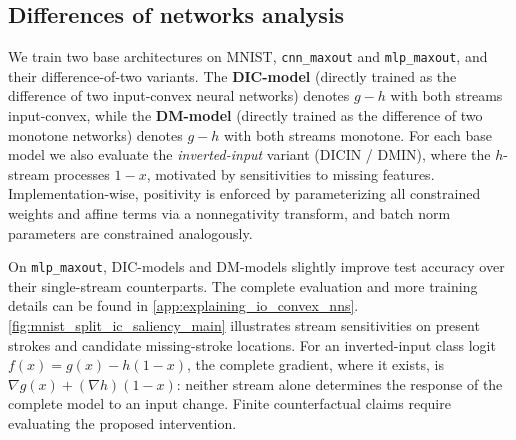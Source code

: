 \subsection{Differences of networks analysis} \label{subsec:dc_network_training_methods}



We train two base architectures on MNIST, \texttt{cnn\_maxout} and \texttt{mlp\_maxout}, and their difference-of-two variants.
The \textbf{DIC-model} (directly trained as the difference of two input-convex neural networks) denotes $g-h$ with both streams input-convex, while the \textbf{DM-model} (directly trained as the difference of two monotone networks) denotes $g-h$ with both streams monotone.
For each base model we also evaluate the \emph{inverted-input} variant (DIC\-IN / DM\-IN), where the $h$-stream processes $1-x$, motivated by sensitivities to missing features.
Implementation-wise, positivity is enforced by parameterizing all constrained weights and affine terms via a nonnegativity transform, and batch norm parameters are constrained analogously.

On \texttt{mlp\_maxout}, DIC-models and DM-models slightly improve test accuracy over their single-stream counterparts.
The complete evaluation and more training details can be found in \cref{app:explaining_io_convex_nns}.
\cref{fig:mnist_split_ic_saliency_main} illustrates stream sensitivities on present strokes and candidate missing-stroke locations. For an inverted-input class logit $f(x)=g(x)-h(1-x)$, the complete gradient, where it exists, is $\nabla g(x)+(\nabla h)(1-x)$: neither stream alone determines the response of the complete model to an input change. Finite counterfactual claims require evaluating the proposed intervention.

